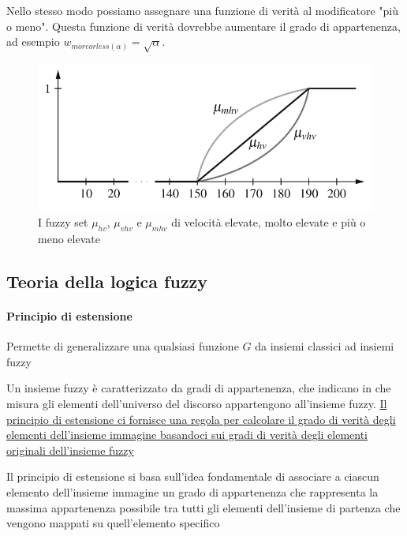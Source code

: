 Nello stesso modo possiamo assegnare una funzione di verità al modificatore "più o meno". Questa funzione di verità dovrebbe aumentare il grado di appartenenza, ad esempio $w_{more or less(\alpha)} = \sqrt{\alpha}$.


\begin{figure}[h]
    \centering
    \includegraphics[scale=0.4]{images/linguistic-modifiers.png}
    \caption{I fuzzy set $\mu_{hv}$, $\mu_{vhv}$ e $\mu_{mhv}$ di velocità elevate, molto elevate e più o meno elevate}
\end{figure}
\subsection{Teoria della logica fuzzy}

\paragraph{Principio di estensione}
Permette di generalizzare una qualsiasi funzione $G$ da insiemi classici ad insiemi fuzzy

Un insieme fuzzy è caratterizzato da gradi di appartenenza, che indicano in che misura gli elementi dell'universo del discorso appartengono all'insieme fuzzy. \uline{Il principio di estensione ci fornisce una regola per calcolare il grado di verità degli elementi dell'insieme immagine basandoci sui gradi di verità degli elementi originali dell'insieme fuzzy}

Il principio di estensione si basa sull'idea fondamentale di associare a ciascun elemento dell'insieme immagine un grado di appartenenza che rappresenta la massima appartenenza possibile tra tutti gli elementi dell'insieme di partenza che vengono mappati su quell'elemento specifico

